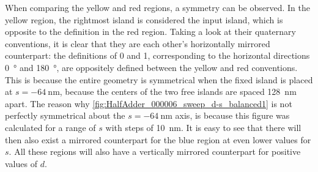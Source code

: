 \documentclass[11pt,a4paper,english,twoside]{article}
\begin{document}
When comparing the yellow and red regions, a symmetry can be observed. In the yellow region, the rightmost island is considered the input island, which is opposite to the definition in the red region. Taking a look at their quaternary conventions, it is clear that they are each other's horizontally mirrored counterpart: the definitions of 0 and 1, corresponding to the horizontal directions \SI{0}{\degree} and \SI{180}{\degree}, are oppositely defined between the yellow and red conventions. This is because the entire geometry is symmetrical when the fixed island is placed at $s=\SI{-64}{\nano\metre}$, because the centers of the two free islands are spaced \SI{128}{\nano\metre} apart. The reason why \cref{fig:HalfAdder_000006_sweep_d-s_balanced1} is not perfectly symmetrical about the $s=\SI{-64}{\nano\metre}$ axis, is because this figure was calculated for a range of $s$ with steps of \SI{10}{\nano\metre}. It is easy to see that there will then also exist a mirrored counterpart for the blue region at even lower values for $s$. All these regions will also have a vertically mirrored counterpart for positive values of $d$.
\end{document}
